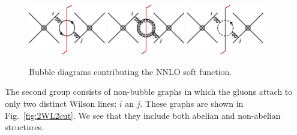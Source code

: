 \documentclass[a4paper,11pt]{article}
\numberwithin{equation}{section}
\begin{document}
\begin{figure}[t]
  \begin{center}
    \includegraphics[width=0.30\textwidth]{plots/sf-nnlo-nf.png}
    \hfill
    \includegraphics[width=0.30\textwidth]{plots/sf-nnlo-gluon.png}
    \hfill
    \includegraphics[width=0.30\textwidth]{plots/sf-nnlo-ghost.png}
  \end{center}
  \caption{Bubble diagrams contributing the NNLO soft function.
  }
  \label{fig:bubble-graphs}
\end{figure}

The second group consists of non-bubble graphs in which the gluons attach to
only two distinct Wilson lines: $i$ an $j$.
%
These graphs are shown in Fig.~\ref{fig:2WL2cut}.  We see that they
include both abelian and non-abelian structures.
\end{document}

